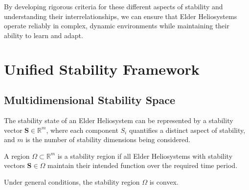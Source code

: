 By developing rigorous criteria for these different aspects of stability and understanding their interrelationships, we can ensure that Elder Heliosystems operate reliably in complex, dynamic environments while maintaining their ability to learn and adapt.

\section{Unified Stability Framework}

\subsection{Multidimensional Stability Space}

\begin{definition}
The stability state of an Elder Heliosystem can be represented by a stability vector $\mathbf{S} \in \mathbb{R}^m$, where each component $S_i$ quantifies a distinct aspect of stability, and $m$ is the number of stability dimensions being considered.
\end{definition}

\begin{definition}
A region $\Omega \subset \mathbb{R}^m$ is a stability region if all Elder Heliosystems with stability vectors $\mathbf{S} \in \Omega$ maintain their intended function over the required time period.
\end{definition}

\begin{theorem}
Under general conditions, the stability region $\Omega$ is convex.
\end{theorem}

